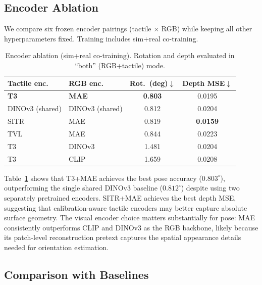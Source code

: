 \subsection{Encoder Ablation}
\label{sec:encoder_ablation}

We compare six frozen encoder pairings (tactile $\times$ RGB) while keeping
all other hyperparameters fixed. Training includes sim+real co-training.

\begin{table}[t]
\caption{Encoder ablation (sim+real co-training). Rotation and depth
evaluated in ``both'' (RGB+tactile) mode.}
\label{tab:encoder_ablation}
\begin{center}
\begin{tabular}{llcc}
\toprule
Tactile enc. & RGB enc. & Rot.\ (deg)$\downarrow$ & Depth MSE$\downarrow$ \\
\midrule
\textbf{T3}     & \textbf{MAE}    & \textbf{0.803} & 0.0195 \\
DINOv3 (shared) & DINOv3 (shared) & 0.812          & 0.0204 \\
SITR            & MAE             & 0.819          & \textbf{0.0159} \\
TVL             & MAE             & 0.844          & 0.0223 \\
T3              & DINOv3          & 1.481          & 0.0204 \\
T3              & CLIP            & 1.659          & 0.0208 \\
\bottomrule
\end{tabular}
\end{center}
\end{table}

Table~\ref{tab:encoder_ablation} shows that T3+MAE achieves the best pose
accuracy ($0.803^{\circ}$), outperforming the single shared DINOv3 baseline
($0.812^{\circ}$) despite using two separately pretrained encoders.
SITR+MAE achieves the best depth MSE, suggesting that calibration-aware
tactile encoders may better capture absolute surface geometry. The visual
encoder choice matters substantially for pose: MAE consistently outperforms
CLIP and DINOv3 as the RGB backbone, likely because its patch-level
reconstruction pretext captures the spatial appearance details needed for
orientation estimation.

\subsection{Comparison with Baselines}
\label{sec:baselines}

